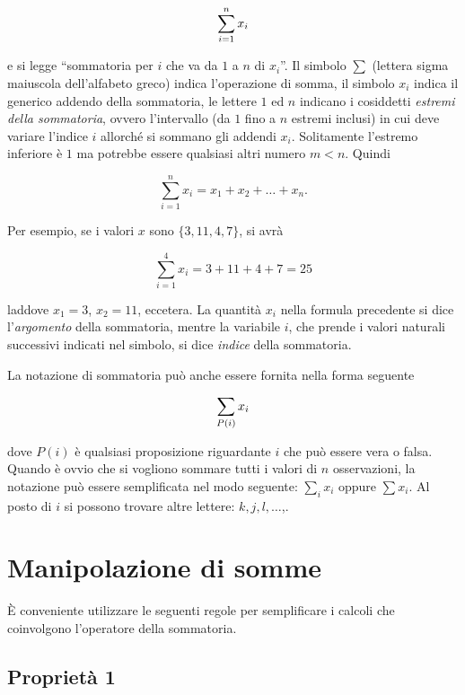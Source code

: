 \documentclass[
  11pt,
]{krantz}
\theoremstyle{definition}
\theoremstyle{definition}
\theoremstyle{definition}
\theoremstyle{definition}
\theoremstyle{remark}
\begin{document}
\begin{equation}
  \sum_{i=1}^n x_i\notag
\end{equation}

e si legge ``sommatoria per \(i\) che va da \(1\) a \(n\) di \(x_i\)''. Il simbolo \(\sum\) (lettera sigma maiuscola dell'alfabeto greco) indica l'operazione di somma, il simbolo \(x_i\) indica il generico addendo della sommatoria, le lettere \(1\) ed \(n\) indicano i cosiddetti \emph{estremi della sommatoria}, ovvero l'intervallo (da \(1\) fino a \(n\) estremi inclusi) in cui deve variare l'indice \(i\) allorché si sommano gli addendi \(x_i\). Solitamente l'estremo inferiore è \(1\) ma potrebbe essere qualsiasi altri numero \(m < n\). Quindi

\[
  \sum_{i=1}^n x_i = x_1 + x_{2} + \dots + x_{n}.
\]

Per esempio, se i valori \(x\) sono \(\{3, 11, 4, 7\}\), si avrà

\[
  \sum_{i=1}^4 x_i = 3+11+4+7 = 25 
\]

laddove \(x_1 = 3\), \(x_2 = 11\), eccetera. La quantità \(x_i\) nella formula precedente si dice l'\emph{argomento} della sommatoria, mentre la variabile \(i\), che prende i valori naturali successivi indicati nel simbolo, si dice \emph{indice} della sommatoria.

La notazione di sommatoria può anche essere fornita nella forma seguente

\begin{equation}
  \sum_{P(i)} x_i\notag
\end{equation}

dove \(P(i)\) è qualsiasi proposizione riguardante \(i\) che può essere vera o falsa. Quando è ovvio che si vogliono sommare tutti i valori di \(n\) osservazioni, la notazione può essere semplificata nel modo seguente: \(\sum_{i} x_i\) oppure \(\sum x_i\). Al posto di \(i\) si possono trovare altre lettere: \(k, j, l, \dots\),.

\hypertarget{manipolazione-di-somme}{%
\section{Manipolazione di somme}\label{manipolazione-di-somme}}

È conveniente utilizzare le seguenti regole per semplificare i calcoli che coinvolgono l'operatore della sommatoria.

\hypertarget{proprietuxe0-1}{%
\subsection{Proprietà 1}\label{proprietuxe0-1}}
\end{document}
